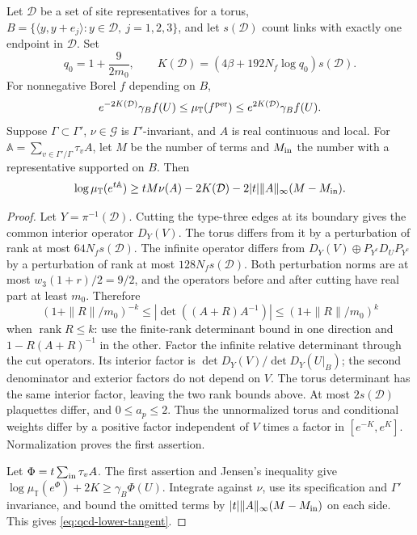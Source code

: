 \documentclass[11pt,letterpaper,reqno]{amsart}
\makeatletter
\theoremstyle{definition}
\newcommand{\ms@minorstart}{%
  \pushQED{\qed}\renewcommand{\qedsymbol}{$\blacksquare$}}
\newenvironment{lemma}[1][]{\ms@minorstart\ms@lemma[#1]}
  {\popQED\endms@lemma}
\theoremstyle{remark}
\makeatother
\begin{document}
\begin{lemma}[Surface comparison]\label{C-386-30}
Let $\mathcal D$ be a set of site representatives for a torus,
$B=\{\langle y,y+e_j\rangle:y\in\mathcal D,\ j=1,2,3\}$,
and let $s(\mathcal D)$ count links with exactly one endpoint in
$\mathcal D$. Set
\[
 q_0=1+\frac9{2m_0},\qquad
 K(\mathcal D)=(4\beta+192N_f\log q_0)s(\mathcal D).
\]
For nonnegative Borel $f$ depending on $B$,
\[
 e^{-2K(\mathcal D)}\gamma_Bf(U)
     \le\mu_{\mathbb T}(f^{\rm per})
     \le e^{2K(\mathcal D)}\gamma_Bf(U).
\]
Suppose $\Gamma\subset\Gamma'$, $\nu\in\mathcal G$ is
$\Gamma'$-invariant, and $A$ is real continuous and local.
For $\mathbb A=\sum_{v\in\Gamma'/\Gamma}\tau_vA$, let $M$
be the number of terms and $M_{\rm in}$ the number with a
representative supported on $B$. Then
\begin{equation}\label{eq:qcd-lower-tangent}
 \log\mu_{\mathbb T}(e^{t\mathbb A})
 \ge tM\nu(A)-2K(\mathcal D)
            -2|t|\|A\|_\infty(M-M_{\rm in}).
\end{equation}
\end{lemma}

\begin{proof}
Let $Y=\pi^{-1}(\mathcal D)$. Cutting the type-three edges at
its boundary gives the common interior operator $D_Y(V)$.
The torus differs from it by a perturbation of rank at most
$64N_fs(\mathcal D)$. The infinite operator differs from
$D_Y(V)\oplus P_{Y^c}D_UP_{Y^c}$ by a perturbation of rank at
most $128N_fs(\mathcal D)$. Both perturbation norms are at most
$w_3(1+r)/2=9/2$, and the operators before and after cutting have
real part at least $m_0$. Therefore
\[
 (1+\|R\|/m_0)^{-k}
  \le|\det((A+R)A^{-1})|\le(1+\|R\|/m_0)^k
\]
when $\operatorname{rank}R\le k$: use the finite-rank determinant
bound in one direction and $1-R(A+R)^{-1}$ in the other.
Factor the infinite relative determinant through the cut operators.
Its interior factor is $\det D_Y(V)/\det D_Y(U|_B)$; the second
denominator and exterior factors do not depend on $V$.
The torus determinant has the same interior factor, leaving the
two rank bounds above. At most $2s(\mathcal D)$ plaquettes
differ, and $0\le a_p\le2$. Thus the unnormalized torus and
conditional weights differ by a positive factor independent of
$V$ times a factor in $[e^{-K},e^K]$. Normalization proves the
first assertion.

Let $\Phi=t\sum_{\rm in}\tau_vA$. The first assertion and
Jensen's inequality give
$\log\mu_{\mathbb T}(e^\Phi)+2K\ge\gamma_B\Phi(U)$.
Integrate against $\nu$, use its specification and $\Gamma'$
invariance, and bound the omitted terms by
$|t|\|A\|_\infty(M-M_{\rm in})$ on each side. This gives
\eqref{eq:qcd-lower-tangent}.
\end{proof}
\end{document}

